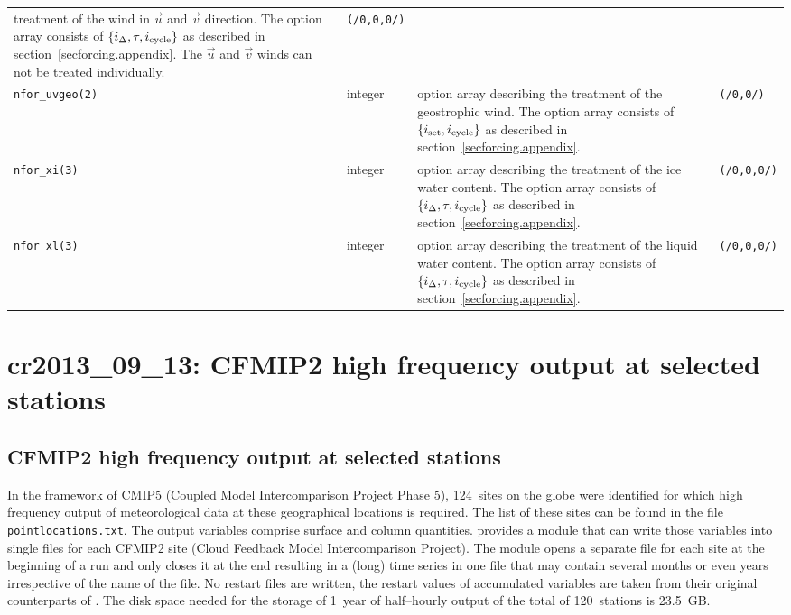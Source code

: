\begin{appendix}
\begin{longtable}{l@{\extracolsep\fill}lp{5.0cm}p{3.0cm}}
treatment of the wind in $\vec{u}$ and $\vec{v}$ direction. The option array consists of
$\{i_\Delta,\tau,i_{\rm cycle}\}$ as described in section~\ref{secforcing.appendix}. The $\vec{u}$
and $\vec{v}$ winds can not be treated individually.
                                 &   {\tt (/0,0,0/)}  \\ 
{\tt nfor\_uvgeo(2)}       &integer & option array describing the
treatment of the geostrophic wind. The option array consists of
$\{i_{\rm set},i_{\rm cycle}\}$ as described in section~\ref{secforcing.appendix}. & {\tt (/0,0/)} \\
{\tt nfor\_xi(3)}       &integer   & option array describing the
treatment of the ice water content. The option array consists of
$\{i_\Delta,\tau,i_{\rm cycle}\}$ as described in section~\ref{secforcing.appendix}.
                                 &   {\tt (/0,0,0/)}  \\ 
{\tt nfor\_xl(3)}       &integer   & option array describing the
treatment of the liquid water content. The option array consists of
$\{i_\Delta,\tau,i_{\rm cycle}\}$ as described in section~\ref{secforcing.appendix}.
                                 &   {\tt (/0,0,0/)}  \\ 
\hline 
\end{longtable}

\section[cr2013\_09\_13: Station diagnostics]{cr2013\_09\_13: CFMIP2
  high frequency output at selected stations}\label{cr20130913}

\subsection{CFMIP2 high frequency output at selected stations}\label{seccfmip2}

In the framework of CMIP5 (Coupled Model Intercomparison Project
Phase 5), 124~sites on the globe were identified for which high frequency
output of meteorological data at these geographical locations is
required. The list of these sites can be found in the file {\tt
  pointlocations.txt}. The output variables comprise surface and column
quantities. \echam{} provides a module that can write those
variables into single files for each CFMIP2 site (Cloud Feedback Model
Intercomparison Project). The module opens a 
separate file for each site at the beginning of a run and only closes
it at the end resulting in a (long) time series in one file that may
contain several months or even years irrespective of the name of the
file. No restart files are written, the restart values of accumulated
variables are taken from their original counterparts of \echam.
The disk space needed
for the storage of 1~year of half--hourly output of the total of
120~stations is 23.5~GB. 



\end{appendix}
